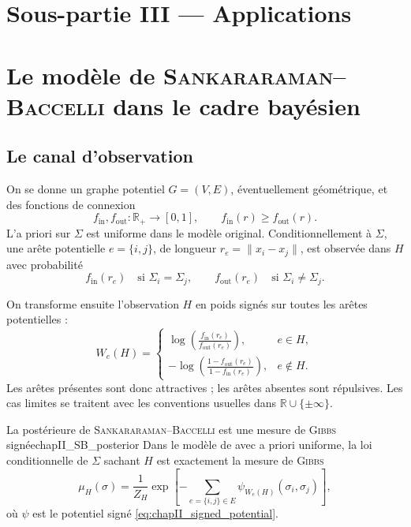 \section*{Sous-partie III --- Applications}
\label{sec:chapII_partie_applications}

\section{Le modèle de \textsc{Sankararaman--Baccelli} dans le cadre bayésien}
\label{sec:chapII_SB}

\subsection{Le canal d'observation}

On se donne un graphe potentiel $G=(V,E)$, éventuellement géométrique, et des fonctions de connexion
\[
    f_{\mathrm{in}},f_{\mathrm{out}}:\mathbb R_+\to[0,1],
    \qquad
    f_{\mathrm{in}}(r)\ge f_{\mathrm{out}}(r).
\]
L'a priori sur $\Sigma$ est uniforme dans le modèle original. Conditionnellement à $\Sigma$, une arête potentielle $e=\{i,j\}$, de longueur $r_e=\|x_i-x_j\|$, est observée dans $H$ avec probabilité
\[
    f_{\mathrm{in}}(r_e)\quad\text{si }\Sigma_i=\Sigma_j,
    \qquad
    f_{\mathrm{out}}(r_e)\quad\text{si }\Sigma_i\neq\Sigma_j.
\]

On transforme ensuite l'observation $H$ en poids signés sur toutes les arêtes potentielles :
\begin{equation}
    W_e(H)=
    \begin{cases}
        \displaystyle \log\left(\frac{f_{\mathrm{in}}(r_e)}{f_{\mathrm{out}}(r_e)}\right),& e\in H,\\[2ex]
        \displaystyle -\log\left(\frac{1-f_{\mathrm{out}}(r_e)}{1-f_{\mathrm{in}}(r_e)}\right),& e\notin H.
    \end{cases}
    \label{eq:chapII_SB_weights}
\end{equation}
Les arêtes présentes sont donc attractives ; les arêtes absentes sont répulsives. Les cas limites se traitent avec les conventions usuelles dans $\mathbb R\cup\{\pm\infty\}$.

\begin{Fait}{La postérieure de \textsc{Sankararaman--Baccelli} est une mesure de \textsc{Gibbs} signée}{chapII_SB_posterior}
Dans le modèle de \SB{} avec a priori uniforme, la loi conditionnelle de $\Sigma$ sachant $H$ est exactement la mesure de \textsc{Gibbs}
\begin{equation}
    \mu_H(\sigma)
    =
    \frac1{Z_H}
    \exp\left[-\sum_{e=\{i,j\}\in E}\psi_{W_e(H)}(\sigma_i,\sigma_j)\right],
    \label{eq:chapII_SB_gibbs}
\end{equation}
où $\psi$ est le potentiel signé \eqref{eq:chapII_signed_potential}.
\end{Fait}

